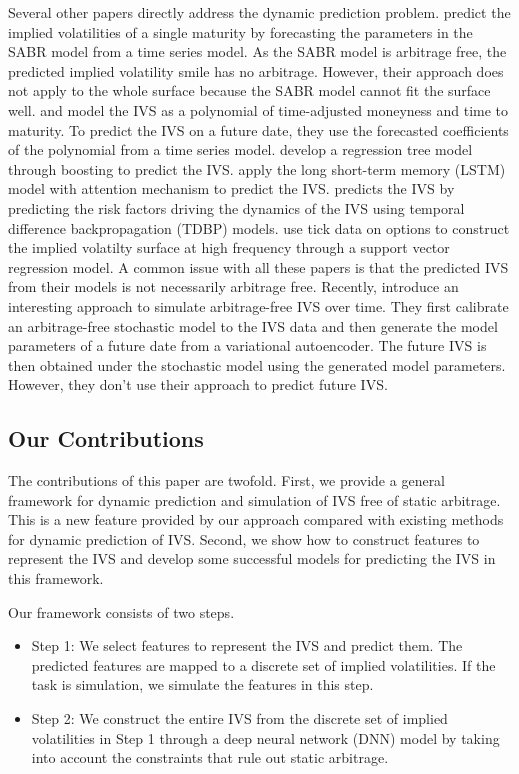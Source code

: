 \documentclass[11pt,a4paper]{article}
\theoremstyle{remark}
\begin{document}
Several other papers directly address the dynamic prediction problem. \cite{dellaportas2014arbitrage} predict the implied volatilities of a single maturity by forecasting the parameters in the SABR model from a time series model. As the SABR model is arbitrage free, the predicted implied volatility smile has no arbitrage. However, their approach does not apply to the whole surface because the SABR model cannot fit the surface well. 
\cite{goncalves2006predictable} and \cite{bernales2014can} model the IVS as a polynomial of time-adjusted moneyness and time to maturity. To predict the IVS on a future date, they use the forecasted coefficients of the polynomial from a time series model. 
\cite{audrino2010semi} develop a regression tree model through boosting to predict the IVS.
\cite{chen2019forecasting} apply the long short-term memory (LSTM) model with attention mechanism to predict the IVS. \cite{bloch2020predicting} predicts the IVS by predicting the risk factors driving the dynamics of the IVS using temporal difference backpropagation (TDBP) models.  \cite{zeng2019online} use tick data on options to construct the implied volatilty surface at high frequency through a support vector regression model. A common issue with all these papers is that the predicted IVS from their models is not necessarily arbitrage free. Recently, \cite{ning2021arbitrage} introduce an interesting approach to simulate arbitrage-free IVS over time. They first calibrate an arbitrage-free stochastic model to the IVS data and then generate the model parameters of a future date from a variational autoencoder. The future IVS is then obtained under the stochastic model using the generated model parameters. However, they don't use their approach to predict future IVS.

 


\subsection{Our Contributions}
The contributions of this paper are twofold. First, we provide a general framework for dynamic prediction and simulation of IVS free of static arbitrage. This is a new feature provided by our approach compared with existing methods for dynamic prediction of IVS.
Second, we show how to construct features to represent the IVS and develop some successful models for predicting the IVS in this framework. 

Our framework consists of two steps. 
\begin{itemize}
	\item Step 1: We select features to represent the IVS and predict them. The predicted features are mapped to a discrete set of implied volatilities. If the task is simulation, we simulate the features in this step. 
	
	\item Step 2: We construct the entire IVS from the discrete set of implied volatilities in Step 1 through a deep neural network (DNN) model by taking into account the constraints that rule out static arbitrage. 
\end{itemize}
\end{document}
